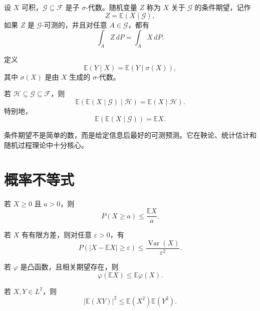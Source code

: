 \begin{definition}
设 $X$ 可积，$\mathcal{G}\subseteq\mathcal{F}$ 是子 $\sigma$-代数。随机变量 $Z$ 称为 $X$ 关于 $\mathcal{G}$ 的条件期望，记作
\[
    Z=\mathbb{E}(X\mid\mathcal{G}),
\]
如果 $Z$ 是 $\mathcal{G}$-可测的，并且对任意 $A\in\mathcal{G}$，都有
\[
    \int_A Z\,dP=\int_A X\,dP.
\]
\end{definition}

\begin{definition}[关于随机变量的条件期望]
定义
\[
    \mathbb{E}(Y\mid X)=\mathbb{E}(Y\mid\sigma(X)),
\]
其中 $\sigma(X)$ 是由 $X$ 生成的 $\sigma$-代数。
\end{definition}

\begin{theorem}[塔式性质]
若 $\mathcal{H}\subseteq\mathcal{G}\subseteq\mathcal{F}$，则
\[
    \mathbb{E}\left(\mathbb{E}(X\mid\mathcal{G})\mid\mathcal{H}\right)
    =\mathbb{E}(X\mid\mathcal{H}).
\]
特别地，
\[
    \mathbb{E}\left(\mathbb{E}(X\mid\mathcal{G})\right)=\mathbb{E}X.
\]
\end{theorem}

\begin{remark}
条件期望不是简单的数，而是给定信息后最好的可测预测。它在鞅论、统计估计和随机过程理论中十分核心。
\end{remark}

\section{概率不等式}

\begin{theorem}
若 $X\ge0$ 且 $a>0$，则
\[
    P(X\ge a)\le\frac{\mathbb{E}X}{a}.
\]
\end{theorem}

\begin{theorem}
若 $X$ 有有限方差，则对任意 $\varepsilon>0$，有
\[
    P(|X-\mathbb{E}X|\ge\varepsilon)
    \le\frac{\operatorname{Var}(X)}{\varepsilon^2}.
\]
\end{theorem}

\begin{theorem}
若 $\varphi$ 是凸函数，且相关期望存在，则
\[
    \varphi(\mathbb{E}X)\le\mathbb{E}\varphi(X).
\]
\end{theorem}

\begin{theorem}
若 $X,Y\in L^2$，则
\[
    |\mathbb{E}(XY)|^2\le\mathbb{E}(X^2)\mathbb{E}(Y^2).
\]
\end{theorem}

